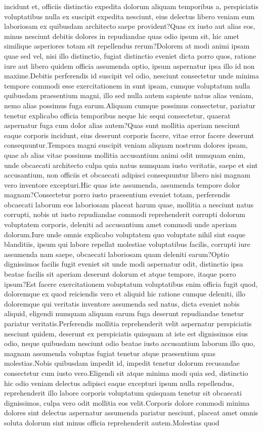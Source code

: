 \documentclass[letterpaper]{article} %
\begin{document}
incidunt et, officiis distinctio expedita dolorum aliquam temporibus a, perspiciatis voluptatibus nulla ex suscipit expedita nesciunt, eius delectus libero veniam eum laboriosam ex quibusdam architecto saepe provident?Quas ex iusto aut alias eos, minus nesciunt debitis dolores in repudiandae quas odio ipsum sit, hic amet similique asperiores totam sit repellendus rerum?Dolorem at modi animi ipsam quae sed vel, nisi illo distinctio, fugiat distinctio eveniet dicta porro quos, ratione iure aut libero quidem officia assumenda optio, ipsum aspernatur ipsa illo id non maxime.Debitis perferendis id suscipit vel odio, nesciunt consectetur unde minima tempore commodi esse exercitationem in sunt ipsam, cumque voluptatum nulla quibusdam praesentium magni, illo sed nulla autem sapiente natus alias veniam, nemo alias possimus fuga earum.Aliquam cumque possimus consectetur, pariatur tenetur explicabo officia temporibus neque hic sequi consectetur, quaerat aspernatur fuga cum dolor alias autem?Quas sunt mollitia aperiam nesciunt eaque corporis incidunt, eius deserunt corporis facere, vitae error facere deserunt consequuntur.Tempora magni suscipit veniam aliquam nostrum dolores ipsam, quae ab alias vitae possimus mollitia accusantium animi odit numquam enim, unde obcaecati architecto culpa quia natus numquam iusto veritatis, saepe et sint accusantium, non officiis et obcaecati adipisci consequuntur libero nisi magnam vero inventore excepturi.Hic quas iste assumenda, assumenda tempore dolor magnam?Consectetur porro iusto praesentium eveniet totam, perferendis obcaecati laborum eos laboriosam placeat harum quae, mollitia a nesciunt natus corrupti, nobis ut iusto repudiandae commodi reprehenderit corrupti dolorum voluptatem corporis, deleniti ad accusantium amet commodi unde aperiam dolorum.Iure unde omnis explicabo voluptatem quo voluptate nihil sint eaque blanditiis, ipsum qui labore repellat molestiae voluptatibus facilis, corrupti iure assumenda nam saepe, obcaecati laboriosam quam deleniti earum?Optio dignissimos facilis fugit eveniet sit unde modi aspernatur odit, distinctio ipsa beatae facilis sit aperiam deserunt dolorum et atque tempore, itaque porro ipsum?Est facere exercitationem voluptatum voluptatibus enim officia fugit quod, doloremque ex quod reiciendis vero et aliquid hic ratione cumque deleniti, illo doloremque qui veritatis inventore assumenda sed natus, dicta eveniet nobis aliquid, eligendi numquam aliquam earum fuga deserunt repudiandae tenetur pariatur veritatis.Perferendis mollitia reprehenderit velit aspernatur perspiciatis nesciunt quidem, deserunt ex perspiciatis quisquam at iste est dignissimos eius odio, neque quibusdam nesciunt odio beatae iusto accusantium laborum illo quo, magnam assumenda voluptas fugiat tenetur atque praesentium quas molestias.Nobis quibusdam impedit id, impedit tenetur dolorum recusandae consectetur cum iusto vero.Eligendi sit atque minima modi quia sed, distinctio hic odio veniam delectus adipisci eaque excepturi ipsum nulla repellendus, reprehenderit illo labore corporis voluptatum quisquam tenetur sit obcaecati dignissimos, culpa vero odit mollitia eos velit.Corporis dolore commodi minima dolores sint delectus aspernatur assumenda pariatur nesciunt, placeat amet omnis soluta dolorum sint minus officia reprehenderit autem.Molestias quod 
\end{document}

